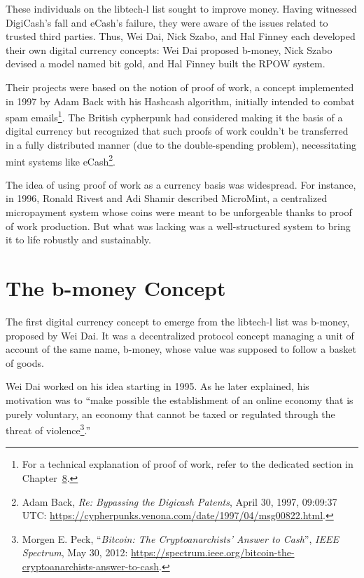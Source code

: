 \documentclass[
  a5paper,
  smalldemyvopaper,10pt,twoside,onecolumn,openright,extrafontsizes,hidelinks]{memoir}
\begin{document}
These individuals on the libtech-l list sought to improve money. Having
witnessed DigiCash's fall and eCash's failure, they were aware of the
issues related to trusted third parties. Thus, Wei Dai, Nick Szabo, and
Hal Finney each developed their own digital currency concepts: Wei Dai
proposed b-money, Nick Szabo devised a model named bit gold, and Hal
Finney built the RPOW system.

Their projects were based on the notion of proof of work, a concept
implemented in 1997 by Adam Back with his Hashcash algorithm, initially
intended to combat spam emails\footnote{For a technical explanation of
  proof of work, refer to the dedicated section in
  Chapter~\hyperref[ch:confirmation]{8}.}. The British cypherpunk had
considered making it the basis of a digital currency but recognized that
such proofs of work couldn't be transferred in a fully distributed
manner (due to the double-spending problem), necessitating mint systems
like eCash\footnote{Adam Back, \emph{Re: Bypassing the Digicash
  Patents}, April 30, 1997, 09:09:37 UTC:
  \url{https://cypherpunks.venona.com/date/1997/04/msg00822.html}.}.

The idea of using proof of work as a currency basis was widespread. For
instance, in 1996, Ronald Rivest and Adi Shamir described MicroMint, a
centralized micropayment system whose coins were meant to be unforgeable
thanks to proof of work production. But what was lacking was a
well-structured system to bring it to life robustly and sustainably.

\section*{The b-money Concept}\label{the-b-money-concept}


The first digital currency concept to emerge from the libtech-l list was
b-money, proposed by Wei Dai. It was a decentralized protocol concept
managing a unit of account of the same name, b-money, whose value was
supposed to follow a basket of goods.

Wei Dai worked on his idea starting in 1995. As he later explained, his
motivation was to ``make possible the establishment of an online economy
that is purely voluntary, an economy that cannot be taxed or regulated
through the threat of violence\footnote{Morgen E. Peck, ``\emph{Bitcoin:
  The Cryptoanarchists' Answer to Cash}'', \emph{IEEE Spectrum}, May 30,
  2012:
  \url{https://spectrum.ieee.org/bitcoin-the-cryptoanarchists-answer-to-cash}.}.''
\end{document}

